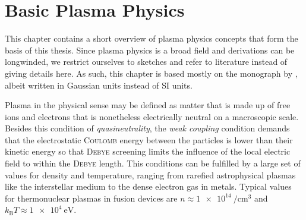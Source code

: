 \section{Basic Plasma Physics}
\label{sec:plasma}

This chapter contains a short overview of plasma physics concepts that form the basis of this thesis. Since plasma physics is a broad field and derivations can be longwinded, we restrict ourselves to sketches and refer to literature instead of giving details here. As such, this chapter is based mostly on the monograph by \textcite{Freidberg14}, albeit written in Gaussian units instead of SI units.

Plasma in the physical sense may be defined as matter that is made up of free ions and electrons that is nonetheless electrically neutral on a macroscopic scale. Besides this condition of \emph{quasineutrality}, the \emph{weak coupling} condition demands that the electrostatic \textsc{Coulomb} energy between the particles is lower than their kinetic energy so that \textsc{Debye} screening limits the influence of the local electric field to within the \textsc{Debye} length. This conditions can be fulfilled by a large set of values for density and temperature, ranging from rarefied astrophysical plasmas like the interstellar medium to the dense electron gas in metals. Typical values for thermonuclear plasmas in fusion devices are $n \approx \SI{1e14}{\per\centi\meter\cubed}$ and $k_{\text{B}} T \approx \SI{1e4}{\electronvolt}$.

